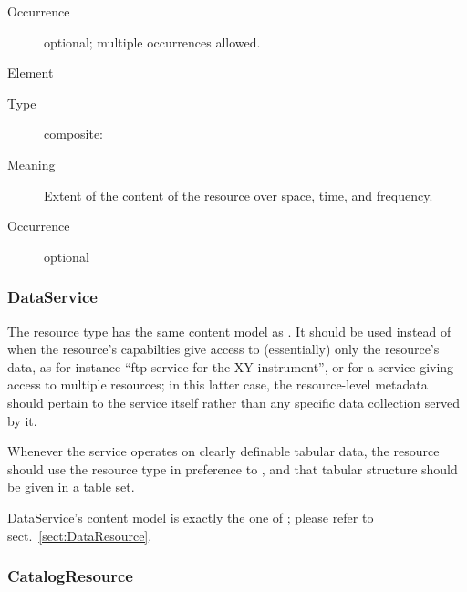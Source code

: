 \documentclass[11pt,a4paper]{ivoa}
\begin{document}
\begin{generated}
\begin{bigdescription}
\begin{description}
\item[Occurrence] optional; multiple occurrences allowed.

\end{description}
\item[Element \xmlel{coverage}]
\begin{description}
\item[Type] composite: 
\item[Meaning] 
                     Extent of the content of the resource over space, time, 
                     and frequency.
                   
\item[Occurrence] optional

\end{description}


\end{bigdescription}\endgroup

\endgroup
\end{generated}


\subsubsection{DataService}

The  resource type has the same content model as
.  It should be used instead of
 when the resource's capabilties give
access to (essentially) only the resource's data, as for instance
``ftp service for the XY instrument'', or for a service giving access
to multiple resources; in this latter case, the resource-level
metadata should pertain to the service itself rather than any specific
data collection served by it.

Whenever the service operates on clearly definable tabular
data, the resource should use the  resource type 
in preference to , and that tabular structure
should be given in a table set.

DataService's content model is exactly the one of
; please refer to sect.~\ref{sect:DataResource}.




\subsubsection{CatalogResource}
\label{sect:CatalogResource}
\end{document}
